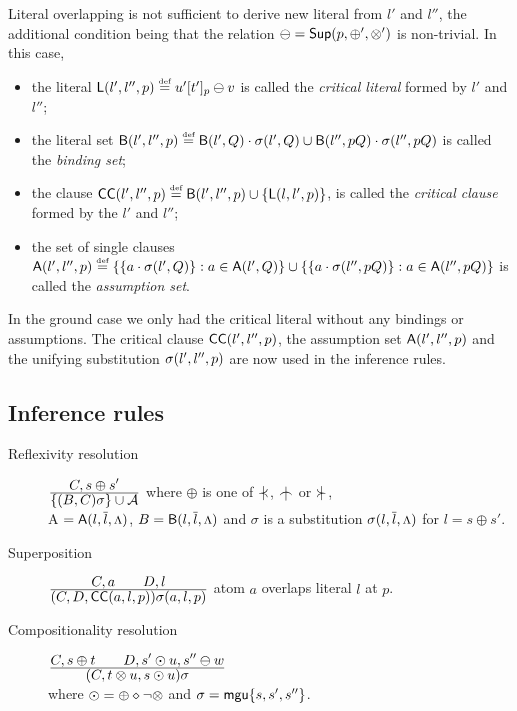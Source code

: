 Literal overlapping is not sufficient to derive new literal from $l'$ and
$l''$, the additional condition being that the relation \(\ominus
=\mbox {\sf Sup}(p ,\oplus' ,\otimes')\) is non-trivial.  In this case,
\begin{itemize}\smallerspaces
\item the literal \({\sf L} (l',l'',p)\mathrel {\stackrel {\mbox {\tiny def}}{=}} u'[t']_p\ominus v\) is called the {\em
    critical literal} formed by  \(l'\) and \(l''\); 
\item the literal set \({\sf B}(l',l'',p)\mathrel {\stackrel {\mbox {\tiny def}}{=}} {\sf B}(l',Q) \cdot \sigma(l',Q )\cup
   {\sf B}(l'',pQ) \cdot \sigma(l'',pQ)\) is called the {\em binding set};
\item the clause \({\sf CC}(l',l'',p)\mathrel {\stackrel {\mbox {\tiny def}}{=}} {\sf B}(l',l'',p) \cup \{{\sf L} (l,l',p)\}\), 
   is called the {\em critical clause} formed by the  \(l'\) and \(l''\);
\item the set of single clauses \({\sf A}(l',l'',p)\mathrel {\stackrel {\mbox {\tiny def}}{=}} \{\{a \cdot \sigma(l',Q)\}:
   a\in{\sf A}(l',Q)\} \cup \{\{a \cdot \sigma(l'',pQ)\}: a\in{\sf A}(l'',pQ)\}\) is
   called the {\em assumption set}.
\end{itemize}
%
In the ground case \cite{KW} 
we only had the critical literal without any bindings or
assumptions.  The critical clause \({\sf CC}(l',l'',p)\), the assumption set
\({\sf A}(l',l'',p)\) and the unifying substitution \(\sigma(l',l'',p)\) are
now used in the  inference rules.

\subsection{Inference rules}

\begin{description}
\item[Reflexivity resolution]\quad\({\displaystyle C,s\oplus s' \over \displaystyle\{(B,C)\sigma\}\cup \mbox {$\cal A$}}\) 
\quad
where \(\oplus\) is one of \(\notIncl\), \(\notInt\) or \(\notCont\),\\[.5ex]
\C A \(={\sf A}(l,\overline{l},\mbox{\footnotesize$\Lambda$})\),
\(B={\sf B}(l,\overline{l},\mbox{\footnotesize$\Lambda$})\) and
$\sigma$ is a substitution \(\sigma(l,\overline{l},\mbox{\footnotesize$\Lambda$})\) for \(l= s\oplus s'\).

\item[Superposition]\quad \({\displaystyle C,a \qquad D,l \over \displaystyle(C,D,{\sf CC}(a,l,p))\sigma(a,l,p)}\) \quad 
atom \(a\) overlaps literal \(l\) at $p$.

\item[Compositionality resolution]
\quad \({\displaystyle C,s\oplus t \qquad D,s'\odot u,s''\ominus w \over \displaystyle(C,t\otimes u,s\odot u)\sigma}\) \quad  \\[.5ex] where
\(\odot = \oplus\diamond\neg\otimes\) and \(\sigma={\sf mgu}\{s,s',s''\}\).
\end{description}

